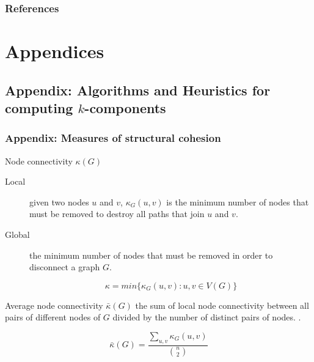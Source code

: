 \documentclass[ignorenonframetext,red,8pt,notes=hide]{beamer}
\begin{document}
\begin{frame}[label=biblio]
\frametitle{References}
\begin{tiny}


\end{tiny}
\end{frame}

\section{Appendices}

\subsection*{Appendix: Algorithms and Heuristics for computing $k$-components}

\begin{frame}
\frametitle{Appendix: Measures of structural cohesion}

\begin{block}{Node connectivity $\kappa(G)$}
\begin{description}
\item[Local] given two nodes $u$ and $v$, $\kappa_{G}(u,v)$ is the minimum number of nodes that must be removed to destroy all paths that join $u$ and $v$.

\item[Global] the minimum number of nodes that must be removed in order to disconnect a graph $G$.

\begin{equation*}
\kappa = min{\{\kappa_{G}(u,v):u,v \in V(G)\}}
\end{equation*}

\end{description}

\end{block}

\begin{block}{Average node connectivity $\bar{\kappa}(G)$}
the sum of local node connectivity between all pairs of different nodes of $G$ divided by the number of distinct pairs of nodes. \citep*{beineke:2002}.

\begin{equation*}
\bar{\kappa}(G) = \frac{\sum_{u,v} \kappa_{G}(u,v)}{{n \choose 2}}
\end{equation*}
\end{block}

\end{frame}
\end{document}
